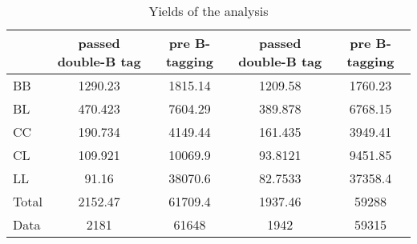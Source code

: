 \documentclass[10pt]{article}
\begin{document}
\begin{table}[htbp]
\begin{center}
\begin{tabular}{|l|S|S|S|S|}
\hline 
 & {passed double-B tag} & {pre B-tagging} & {passed double-B tag} & {pre B-tagging}\\
\hline 
  BB   & 1290.23  & 1815.14  & 1209.58  & 1760.23  \\ 
  BL   & 470.423  & 7604.29  & 389.878  & 6768.15  \\ 
  CC   & 190.734  & 4149.44  & 161.435  & 3949.41  \\ 
  CL   & 109.921  & 10069.9  & 93.8121  & 9451.85  \\ 
  LL   & 91.16  & 38070.6  & 82.7533  & 37358.4  \\ 
\hline 
  Total  & 2152.47  & 61709.4  & 1937.46  & 59288  \\ 
\hline 
  Data   & 2181 & 61648 & 1942 & 59315 \\ 
\hline 
\end{tabular} 
\caption{Yields of the analysis} 
\end{center} 
\end{table} 
\end{document}
